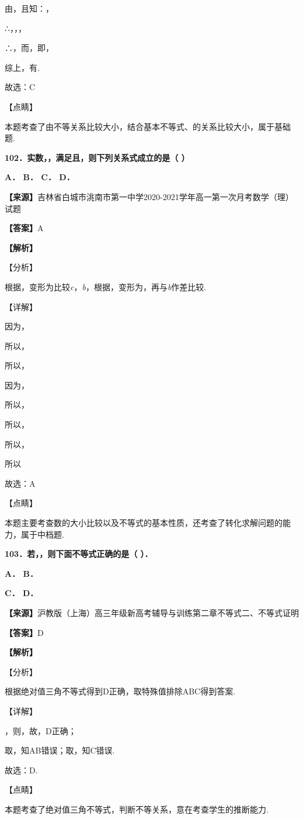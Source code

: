由，且知：，

∴，，，

∴，而，即，

综上，有.

故选：C

【点睛】

本题考查了由不等关系比较大小，结合基本不等式、的关系比较大小，属于基础题.

\textbf{102．实数，，满足且，则下列关系式成立的是（ ）}

\textbf{A． B． C． D．}

\textbf{【来源】}吉林省白城市洮南市第一中学2020-2021学年高一第一次月考数学（理）试题

\textbf{【答案】}A

\textbf{【解析】}

【分析】

根据，变形为比较\emph{c}，\emph{b}，根据，变形为，再与\emph{b}作差比较.

【详解】

因为，

所以，

所以，

因为，

所以，

所以，

所以，

所以

故选：A

【点睛】

本题主要考查数的大小比较以及不等式的基本性质，还考查了转化求解问题的能力，属于中档题.

\textbf{103．若，，则下面不等式正确的是（ ）．}

\textbf{A． B．}

\textbf{C． D．}

\textbf{【来源】}沪教版（上海）高三年级新高考辅导与训练第二章不等式二、不等式证明

\textbf{【答案】}D

\textbf{【解析】}

【分析】

根据绝对值三角不等式得到D正确，取特殊值排除ABC得到答案.

【详解】

，则，故，D正确；

取，知AB错误；取，知C错误.

故选：D.

【点睛】

本题考查了绝对值三角不等式，判断不等关系，意在考查学生的推断能力.

